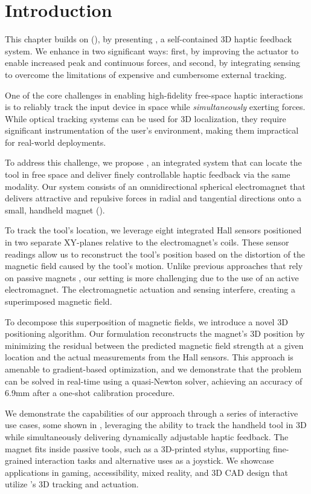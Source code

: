 \section{Introduction}
This chapter builds on \omniHapTitle (), by presenting \omniUIST, a self-contained 3D haptic feedback system. We enhance \omniHap in two significant ways: first, by improving the actuator to enable increased peak and continuous forces, and second, by integrating sensing to overcome the limitations of expensive and cumbersome external tracking.

One of the core challenges in enabling high-fidelity free-space haptic interactions is to reliably track the input device in space while \emph{simultaneously} exerting forces. While optical tracking systems can be used for 3D localization, they require significant instrumentation of the user's environment, making them impractical for real-world deployments.

To address this challenge, we propose \omniUIST, an integrated system that can locate the tool in free space and deliver finely controllable haptic feedback via the same modality. Our system consists of an omnidirectional spherical electromagnet that delivers attractive and repulsive forces in radial and tangential directions onto a small, handheld magnet ().

To track the tool's location, we leverage eight integrated Hall sensors positioned in two separate XY-planes relative to the electromagnet's coils. These sensor readings allow us to reconstruct the tool's position based on the distortion of the magnetic field caused by the tool's motion. Unlike previous approaches that rely on passive magnets \cite{ashbrook2011nenya, liang2012gausssense}, our setting is more challenging due to the use of an active electromagnet. The electromagnetic actuation and sensing interfere, creating a superimposed magnetic field.

To decompose this superposition of magnetic fields, we introduce a novel 3D positioning algorithm. Our formulation reconstructs the magnet's 3D position by minimizing the residual between the predicted magnetic field strength at a given location and the actual measurements from the Hall sensors. This approach is amenable to gradient-based optimization, and we demonstrate that the problem can be solved in real-time using a quasi-Newton solver, achieving an accuracy of 6.9mm after a one-shot calibration procedure.

We demonstrate the capabilities of our approach through a series of interactive use cases, some shown in , leveraging the ability to track the handheld tool in 3D while simultaneously delivering dynamically adjustable haptic feedback. The magnet fits inside passive tools, such as a 3D-printed stylus, supporting fine-grained interaction tasks and alternative uses as a joystick. We showcase applications in gaming, accessibility, mixed reality, and 3D CAD design that utilize \omniUIST's 3D tracking and actuation.

